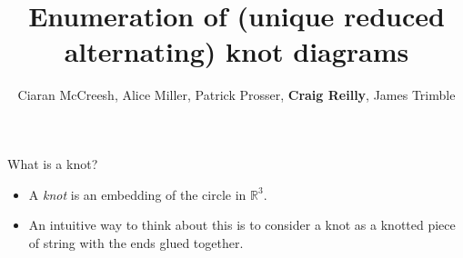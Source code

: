 \documentclass{beamer}
\title{Enumeration of (unique reduced alternating) knot diagrams}
\author[Ciaran McCreesh, Alice Miller, Patrick Prosser, Craig Reilly, James Trimble]{Ciaran McCreesh, Alice Miller, Patrick Prosser, \textbf{Craig Reilly}, James Trimble}
\begin{document}
{
    \begin{frame}
        \titlepage
    \end{frame}
}

\begin{frame}{What is a knot?}
    \begin{itemize}[<+->]
        \item A \emph{knot} is an embedding of the circle in $\mathbb{R}^3$.
        \item An intuitive way to think about this is to consider a knot as a knotted piece of string with the ends glued together.
    \end{itemize}
\end{frame}
\end{document}
